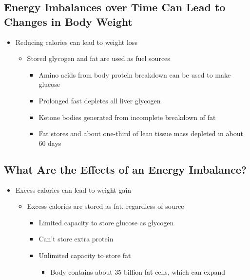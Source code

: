 \documentclass[12pt]{article}
\begin{document}
        \subsection{Energy Imbalances over Time Can Lead to Changes in Body Weight}
            \begin{itemize}
                \item Reducing calories can lead to weight loss
                    \begin{itemize}
                        \item Stored glycogen and fat are used as fuel sources
                            \begin{itemize}
                                \item Amino acids from body protein breakdown can be used to make glucose
                                \item Prolonged fast depletes all liver glycogen
                                \item Ketone bodies generated from incomplete breakdown of fat
                                \item Fat stores and about one-third of lean tissue mass depleted in about 60 days
                            \end{itemize}
                    \end{itemize}
            \end{itemize}

        \subsection{What Are the Effects of an Energy Imbalance?}
            \begin{itemize}
                \item Excess calories can lead to weight gain
                    \begin{itemize}
                        \item Excess calories are stored as fat, regardless of source
                            \begin{itemize}
                                \item Limited capacity to store glucose as glycogen
                                \item Can't store extra protein
                                \item Unlimited capacity to store fat
                                    \begin{itemize}
                                        \item Body contains about 35 billion fat cells, which can expand
                                    \end{itemize}
                            \end{itemize}
                    \end{itemize}
            \end{itemize}
\end{document}
